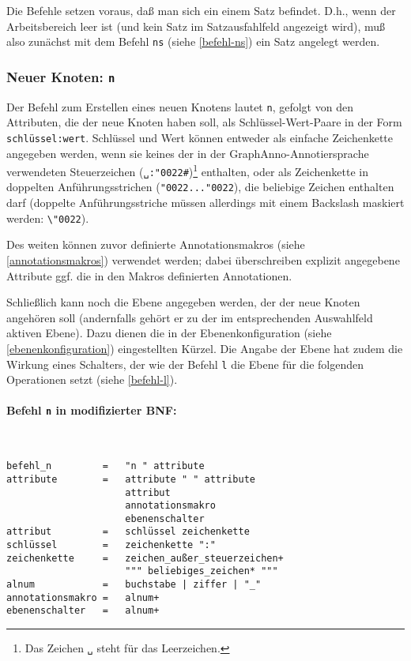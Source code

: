 \documentclass[12pt]{scrartcl}
\newcommand{\quo}{\char"0022}
\begin{document}
Die Befehle setzen voraus, daß man sich ein einem Satz befindet. D.h., wenn der Arbeitsbereich leer ist (und kein Satz im Satzausfahlfeld angezeigt wird), muß also zunächst mit dem Befehl \texttt{ns} (siehe \ref{befehl-ns}) ein Satz angelegt werden.


\subsubsection{Neuer Knoten: \texttt{n}}\label{befehl-n}

Der Befehl zum Erstellen eines neuen Knotens lautet \texttt{n}, gefolgt von den Attributen, die der neue Knoten haben soll, als Schlüssel-Wert-Paare in der Form \texttt{schlüssel:wert}. Schlüssel und Wert können entweder als einfache Zeichenkette angegeben werden, wenn sie keines der in der GraphAnno-Annotiersprache verwendeten Steuerzeichen (\texttt{␣:\quo\#})\footnote{Das Zeichen \texttt{␣} steht für das Leerzeichen.} enthalten, oder als Zeichenkette in doppelten Anführungsstrichen (\texttt{\quo...\quo}), die beliebige Zeichen enthalten darf (doppelte Anführungsstriche müssen allerdings mit einem Backslash maskiert werden: \texttt{\textbackslash\quo}).

Des weiten können zuvor definierte Annotationsmakros (siehe \ref{annotationsmakros}) verwendet werden; dabei überschreiben explizit angegebene Attribute ggf. die in den Makros definierten Annotationen.

Schließlich kann noch die Ebene angegeben werden, der der neue Knoten angehören soll (andernfalls gehört er zu der im entsprechenden Auswahlfeld aktiven Ebene). Dazu dienen die in der Ebenenkonfiguration (siehe \ref{ebenenkonfiguration}) eingestellten Kürzel. Die Angabe der Ebene hat zudem die Wirkung eines Schalters, der wie der Befehl \texttt{l} die Ebene für die folgenden Operationen setzt (siehe \ref{befehl-l}).

\paragraph*{Befehl \texttt{n} in modifizierter BNF:}
~
\begin{framed}
\begin{lstlisting}
befehl_n         =   "n " attribute
attribute        =   attribute " " attribute
                     attribut
                     annotationsmakro
                     ebenenschalter
attribut         =   schlüssel zeichenkette
schlüssel        =   zeichenkette ":"
zeichenkette     =   zeichen_außer_steuerzeichen+
                     """ beliebiges_zeichen* """
alnum            =   buchstabe | ziffer | "_"
annotationsmakro =   alnum+
ebenenschalter   =   alnum+
\end{lstlisting}
\end{framed}
\end{document}
